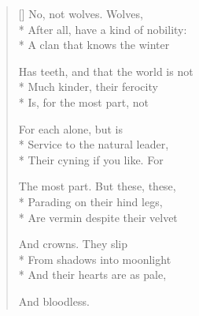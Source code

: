 \label{ch:lear_au}
\settowidth{\versewidth}{Has teeth, and that the world is not}
\begin{verse}[\versewidth]
No, not wolves.   Wolves,\\*
After all, have a kind of nobility:\\*
A clan that knows the winter

Has teeth, and that the world is not\\*
Much kinder, their ferocity\\*
Is, for the most part, not

For each alone, but is\\*
Service to the natural leader,\\*
Their cyning if you like. For

The most part.  But these, these,\\*
Parading on their hind legs,\\*
Are vermin despite their velvet

And crowns.     They slip\\*
From shadows into moonlight\\*
And their hearts are as pale,

And bloodless.
\end{verse}
